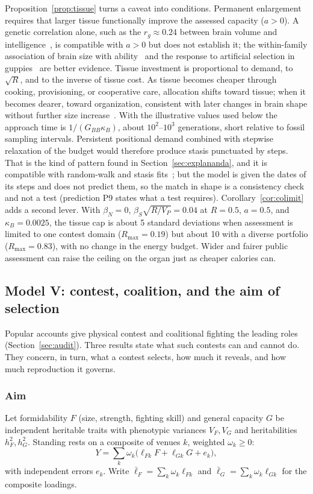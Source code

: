 Proposition~\ref{prop:tissue} turns a caveat into conditions. Permanent enlargement requires that larger tissue functionally
improve the assessed capacity ($a>0$). A genetic correlation alone, such as the $r_g\approx0.24$ between brain volume and
intelligence~\cite{jansen2020}, is compatible with $a>0$ but does not establish it; the within-family association of brain
size with ability~\cite{lee2019} and the response to artificial selection in guppies~\cite{kotrschal2013} are better evidence.
Tissue investment is proportional to demand, to $\sqrt R$, and to the inverse of tissue cost. As tissue becomes cheaper
through cooking, provisioning, or cooperative care, allocation shifts toward tissue; when it becomes dearer, toward
organization, consistent with later changes in brain shape without further size increase~\cite{neubauer2018}. With the
illustrative values used below the approach time is $1/(G_{BB}\kappa_B)$, about $10^2$--$10^3$ generations, short relative to
fossil sampling intervals. Persistent positional demand combined with stepwise relaxation of the budget would therefore
produce stasis punctuated by steps. That is the kind of pattern found in Section~\ref{sec:explananda}, and it is compatible
with random-walk and stasis fits~\cite{hubbe2026}; but the model is given the dates of its steps and does not predict them,
so the match in shape is a consistency check and not a test (prediction P9 states what a test requires).
Corollary~\ref{cor:colimit} adds a second lever. With $\beta_N=0$, $\beta_S\sqrt{R/V_P}=0.04$ at $R=0.5$, $a=0.5$, and
$\kappa_B=0.0025$, the tissue cap is about 5 standard deviations when assessment is limited to one contest domain
($R_{\max}=0.19$) but about 10 with a diverse portfolio ($R_{\max}=0.83$), with no change in the energy budget. Wider and fairer
public assessment can raise the ceiling on the organ just as cheaper calories can.

\subsection{Model V: contest, coalition, and the aim of selection}\label{sec:modelv}

Popular accounts give physical contest and coalitional fighting the leading roles (Section~\ref{sec:audit}). Three
results state what such contests can and cannot do. They concern, in turn, what a contest selects, how much it reveals, and
how much reproduction it governs.

\subsubsection{Aim} Let formidability $F$ (size, strength, fighting skill) and general capacity $G$ be independent
heritable traits with phenotypic variances $V_F,V_G$ and heritabilities $h_F^2,h_G^2$. Standing rests on a composite of
venues $k$, weighted $\omega_k\ge0$:
\begin{equation}
Y=\sum_k\omega_k\big(\ell_{Fk}F+\ell_{Gk}G+e_k\big),\label{eq:venues}
\end{equation}
with independent errors $e_k$. Write $\bar\ell_F=\sum_k\omega_k\ell_{Fk}$ and $\bar\ell_G=\sum_k\omega_k\ell_{Gk}$ for the
composite loadings.

